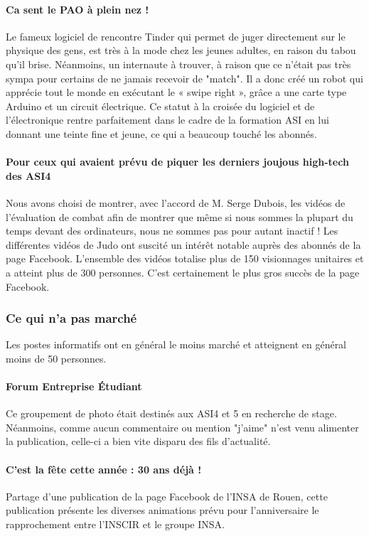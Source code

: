 \paragraph{Ca sent le PAO à plein nez !}
Le fameux logiciel de rencontre Tinder qui permet de juger directement sur le physique des gens, est très à la mode chez les jeunes adultes, en raison du tabou qu'il brise. Néanmoins, un internaute à trouver, à raison que ce n'était pas très sympa pour certains de ne jamais recevoir de "match". Il a donc créé un robot qui apprécie tout le monde en exécutant le « swipe right », grâce a une carte type Arduino et un circuit électrique. Ce statut à la croisée du logiciel et de l'électronique rentre parfaitement dans le cadre de la formation ASI en lui donnant une teinte fine et jeune, ce qui a beaucoup touché les abonnés.


\paragraph{Pour ceux qui avaient prévu de piquer les derniers joujous high-tech des ASI4 }
Nous avons choisi de montrer, avec l'accord de M. Serge Dubois, les vidéos de l'évaluation de combat afin de montrer que même si nous sommes la plupart du temps devant des ordinateurs, nous ne sommes pas pour autant inactif !
Les différentes vidéos de Judo ont suscité un intérêt notable auprès des abonnés de la page Facebook. L'ensemble des vidéos totalise plus de 150 visionnages unitaires et a atteint plus de 300 personnes. C'est certainement le plus gros succès de la page Facebook.


\subsubsection{Ce qui n'a pas marché}
Les postes informatifs ont en général le moins marché et atteignent en général moins de 50 personnes.

\paragraph{Forum Entreprise Étudiant}
Ce groupement de photo était destinés aux ASI4 et 5 en recherche de stage. Néanmoins, comme aucun commentaire ou mention "j'aime" n'est venu alimenter la publication, celle-ci a bien vite disparu des fils d'actualité.

\paragraph{C'est la fête cette année : 30 ans déjà !}
Partage d'une publication de la page Facebook de l'INSA de Rouen, cette publication présente les diverses animations prévu pour l'anniversaire le rapprochement entre l'INSCIR et le groupe INSA.
